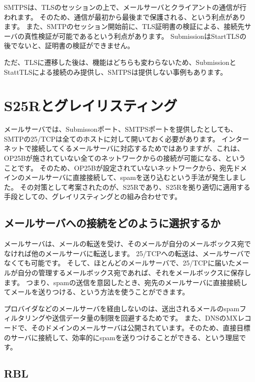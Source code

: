 SMTPSは、TLSのセッションの上で、メールサーバとクライアントの通信が行われます。
そのため、通信が最初から最後まで保護される、という利点があります。
また、SMTPのセッション開始前に、TLS証明書の検証による、接続先サーバの真性検証が可能であるという利点があります。
SubmissionはStartTLSの後でないと、証明書の検証ができません。

ただ、TLSに遷移した後は、機能はどちらも変わらないため、SubmissionとStattTLSによる接続のみ提供し、SMTPSは提供しない事例もあります。


\section{S25Rとグレイリスティング}

メールサーバでは、Submissonポート、SMTPSポートを提供したとしても、SMTPの25/TCPは全てのホストに対して開いておく必要があります。
インターネットで接続してくるメールサーバに対応するためではありますが、これは、OP25Bが施されていない全てのネットワークからの接続が可能になる、ということです。
そのため、OP25Bが設定されていないネットワークから、宛先ドメインのメールサーバに直接接続して、spamを送り込むという手法が発生しました。
その対策として考案されたのが、S25Rであり、S25Rを拠り適切に適用する手段としての、グレイリスティングとの組み合わせです。

\subsection{メールサーバへの接続をどのように選択するか}

メールサーバは、メールの転送を受け、そのメールが自分のメールボックス宛でなければ他のメールサーバに転送します。
25/TCPへの転送は、メールサーバでなくても可能です。
そして、ほとんどのメールサーバで、25/TCPに届いたメールが自分の管理するメールボックス宛であれば、それをメールボックスに保存します。
つまり、spamの送信を意図したとき、宛先のメールサーバに直接接続してメールを送りつける、という方法を使うことができます。

プロバイダなどのメールサーバを経由しないのは、送出されるメールのspamフィルタリングや送信データ量の制限を回避するためです。
また、DNSのMXレコードで、そのドメインのメールサーバは公開されています。そのため、直接目標のサーバに接続して、効率的にspamを送りつけることができる、という理屈です。

\subsection{RBL}

